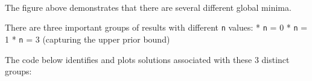 \documentclass[11pt]{article}
\begin{document}
    \begin{center}
    \end{center}
    { \hspace*{\fill} \\}
    
    \begin{Verbatim}[commandchars=\\\{\}]

    \end{Verbatim}

    The figure above demonstrates that there are several different global
minima.

There are three important groups of results with different \texttt{n}
values: * \texttt{n} = 0 * \texttt{n} = 1 * \texttt{n} = 3 (capturing
the upper prior bound)

The code below identifies and plots solutions associated with these 3
distinct groups:
\end{document}
